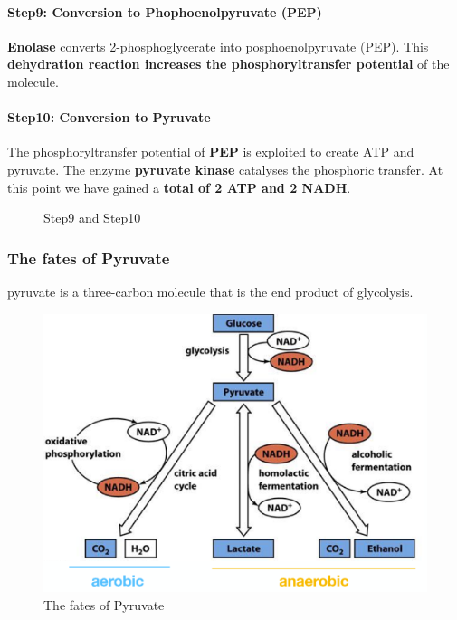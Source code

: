 \documentclass[../main.tex]{subfiles}
\begin{document}
\paragraph{Step9: Conversion to Phophoenolpyruvate (PEP)}
\textbf{Enolase} converts 2-phosphoglycerate into  posphoenolpyruvate (PEP). This \textbf{dehydration reaction increases the phosphoryltransfer potential} of the molecule.

\paragraph{Step10: Conversion to Pyruvate}
The phosphoryltransfer potential of \textbf{PEP} is exploited to create ATP and pyruvate. The enzyme \textbf{pyruvate kinase} catalyses the phosphoric transfer. At this point we have gained a \textbf{total of 2 ATP and 2 NADH}. 
\begin{figure}[h!]
	\centering
	\caption{Step9 and Step10}
\end{figure}

\subsubsection{The fates of Pyruvate}
\gls{pyruvate} is a three-carbon molecule that is the end product of glycolysis.

\begin{figure}[H]
	\centering
	\includegraphics[width = 0.7 \textwidth]{fate_of_pyruvate}
	\caption{The fates of Pyruvate}
\end{figure}
\end{document}
